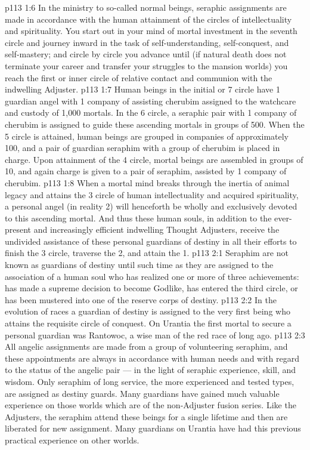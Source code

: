 \vs p113 1:6 \pc In the ministry to so\hyp{}called normal beings, seraphic assignments are made in accordance with the human attainment of the circles of intellectuality and spirituality. You start out in your mind of mortal investment in the seventh circle and journey inward in the task of self\hyp{}understanding, self\hyp{}conquest, and self\hyp{}mastery; and circle by circle you advance until (if natural death does not terminate your career and transfer your struggles to the mansion worlds) you reach the first or inner circle of relative contact and communion with the indwelling Adjuster.
\vs p113 1:7 Human beings in the initial or 7 circle have 1 guardian angel with 1 company of assisting cherubim assigned to the watchcare and custody of 1,000 mortals. In the 6 circle, a seraphic pair with 1 company of cherubim is assigned to guide these ascending mortals in groups of 500. When the 5 circle is attained, human beings are grouped in companies of approximately 100, and a pair of guardian seraphim with a group of cherubim is placed in charge. Upon attainment of the 4 circle, mortal beings are assembled in groups of 10, and again charge is given to a pair of seraphim, assisted by 1 company of cherubim.
\vs p113 1:8 When a mortal mind breaks through the inertia of animal legacy and attains the 3 circle of human intellectuality and acquired spirituality, a personal angel (in reality 2) will henceforth be wholly and exclusively devoted to this ascending mortal. And thus these human souls, in addition to the ever\hyp{}present and increasingly efficient indwelling Thought Adjusters, receive the undivided assistance of these personal guardians of destiny in all their efforts to finish the 3 circle, traverse the 2, and attain the 1.
\vs p113 2:1 Seraphim are not known as guardians of destiny until such time as they are assigned to the association of a human soul who has realized one or more of three achievements: has made a supreme decision to become Godlike, has entered the third circle, or has been mustered into one of the reserve corps of destiny.
\vs p113 2:2 In the evolution of races a guardian of destiny is assigned to the very first being who attains the requisite circle of conquest. On Urantia the first mortal to secure a personal guardian was Rantowoc, a wise man of the red race of long ago.
\vs p113 2:3 All angelic assignments are made from a group of volunteering seraphim, and these appointments are always in accordance with human needs and with regard to the status of the angelic pair --- in the light of seraphic experience, skill, and wisdom. Only seraphim of long service, the more experienced and tested types, are assigned as destiny guards. Many guardians have gained much valuable experience on those worlds which are of the non\hyp{}Adjuster fusion series. Like the Adjusters, the seraphim attend these beings for a single lifetime and then are liberated for new assignment. Many guardians on Urantia have had this previous practical experience on other worlds.
